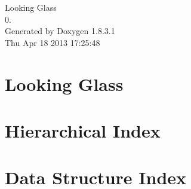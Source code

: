 \documentclass{book}
\begin{document}
\hypersetup{pageanchor=false,citecolor=blue}
\begin{titlepage}
\vspace*{7cm}
\begin{center}
{\Large Looking Glass \\[1ex]\large 0. }\\
\vspace*{1cm}
{\large Generated by Doxygen 1.8.3.1}\\
\vspace*{0.5cm}
{\small Thu Apr 18 2013 17:25:48}\\
\end{center}
\end{titlepage}
\clearemptydoublepage
{}
\tableofcontents
\clearemptydoublepage
{}
\hypersetup{pageanchor=true,citecolor=blue}
\chapter{Looking Glass}
\label{index}\hypertarget{index}{}
\chapter{Hierarchical Index}

\chapter{Data Structure Index}

\end{document}
